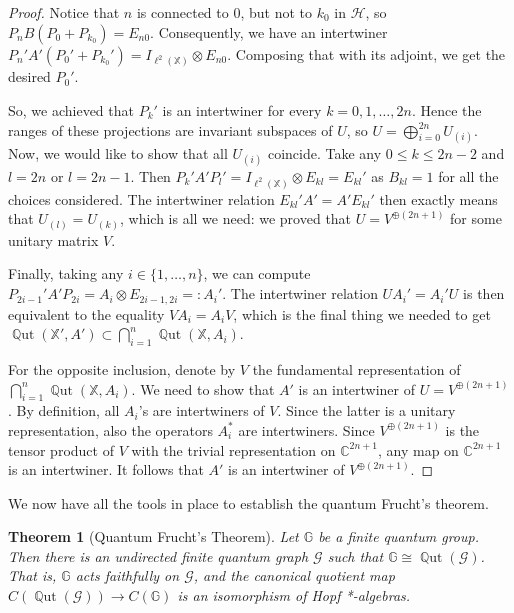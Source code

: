 \documentclass[12pt]{amsart}
\newtheorem{thm}{Theorem}[section]
\theoremstyle{definition}
\theoremstyle{definition}
\theoremstyle{definition}
\theoremstyle{definition}
\DeclareMathOperator{\Qut}{\mathbb{Q}ut}
\newcommand{\I}{{I}}
\newcommand{\G}{\mathbb{G}}
\newcommand{\X}{\mathbb{X}}
\newcommand{\Gr}{\mathcal{G}}
\numberwithin{equation}{section}
\begin{document}
\begin{proof}
Notice that $n$ is connected to $0$, but not to $k_0$ in $\mathcal H$, so $P_nB(P_0+P_{k_0})=E_{n0}$. Consequently, we have an intertwiner $P_{n}'A'(P_0'+P_{k_0}')=\I_{\ell^2(\X)}\otimes E_{n0}$. Composing that with its adjoint, we get the desired $P_0'$.

So, we achieved that $P_k'$ is an intertwiner for every $k=0,1,\dots,2n$. Hence the ranges of these projections are invariant subspaces of $U$, so $U=\bigoplus_{i=0}^{2n} U_{(i)}$. Now, we would like to show that all $U_{(i)}$ coincide. Take any $0\le k\le 2n-2$ and $l=2n$ or $l=2n-1$. Then $P_k'A'P_l'=\I_{\ell^2(\X)}\otimes E_{kl}=E_{kl}'$ as $B_{kl}=1$ for all the choices considered. The intertwiner relation $E_{kl}'A'=A'E_{kl}'$ then exactly means that $U_{(l)}=U_{(k)}$, which is all we need: we proved that $U=V^{\oplus (2n+1)}$ for some unitary matrix $V$.

Finally, taking any $i\in\{1,\ldots,n\}$, we can compute $P_{2i-1}'A'P_{2i}=A_i\otimes E_{2i-1,2i}=:A_i'$. The intertwiner relation $UA_i'=A_i'U$ is then equivalent to the equality $VA_i=A_iV$, which is the final thing we needed to get $\Qut(\X', A')\subset\bigcap_{i=1}^n\Qut(\X, A_i)$.

For the opposite inclusion, denote by $V$ the fundamental representation of $\bigcap_{i=1}^n\Qut(\X, A_i)$. We need to show that $A'$ is an intertwiner of $U=V^{\oplus (2n+1)}$. By definition, all $A_i$'s are intertwiners of $V$. Since the latter is a unitary representation, also the operators $A_i^{\ast}$ are intertwiners. Since $V^{\oplus (2n+1)}$ is the tensor product of $V$ with the trivial representation on $\mathbb{C}^{2n+1}$, any map on $\mathbb{C}^{2n+1}$ is an intertwiner. It follows that $A'$ is an intertwiner of $V^{\oplus (2n+1)}$.  
\end{proof}


We now have all the tools in place to establish the quantum Frucht's theorem.  

\begin{thm}[Quantum Frucht's Theorem]\label{thm:qF}
Let $\G$ be a finite quantum group.  Then there is an undirected finite quantum graph $\Gr$ such that $\G \cong \Qut(\Gr)$.  That is, $\G$ acts faithfully on $\Gr$, and the canonical quotient map $C(\Qut(\Gr)) \to C(\G)$ is an isomorphism of Hopf *-algebras.
\end{thm}
\end{document}
